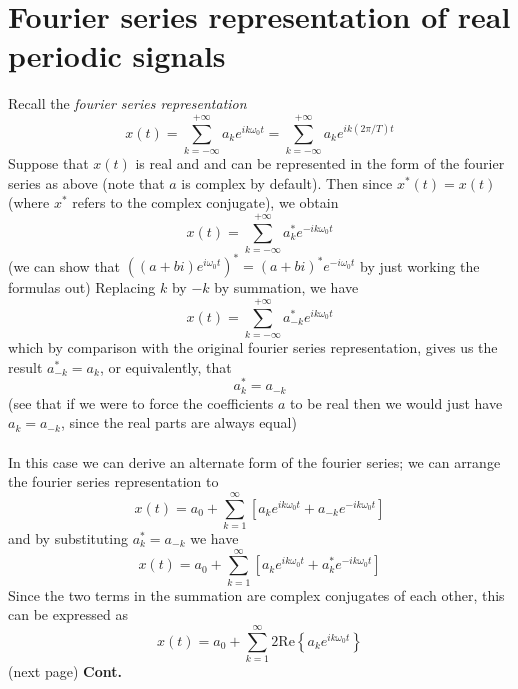 \documentclass{report}
\begin{document}
\section{Fourier series representation of real periodic signals}
Recall the \textit{fourier series representation}
\begin{equation*}
x(t)=\sum^{+\infty}_{k=-\infty}a_ke^{ik\omega_0t}=\sum^{+\infty}_{k=-\infty}a_ke^{ik(2\pi/T)t}
\end{equation*}
Suppose that $x(t)$ is real and and can be represented in the form of the fourier series as above
(note that $a$ is complex by default). Then since $x^*(t)=x(t)$ (where $x^*$ refers to the complex conjugate), we obtain 
\begin{equation*}
x(t)=\sum^{+\infty}_{k=-\infty}a^*_ke^{-ik\omega_0t}
\end{equation*}
(we can show that $\left((a+bi)e^{i\omega_0t}\right)^*=(a+bi)^*e^{-i\omega_0t}$ by just working the formulas out)
Replacing $k$ by $-k$ by summation, we have
\begin{equation*}
x(t)=\sum^{+\infty}_{k=-\infty}a^*_{-k}e^{ik\omega_0t}
\end{equation*}
which by comparison with the original fourier series representation, gives us the result $a^*_{-k}=a_k$, or equivalently, that
\begin{equation*}
a^*_{k}=a_{-k}
\end{equation*}
(see that if we were to force the coefficients $a$ to be real then we would just have $a_k=a_{-k}$, since the real parts are always equal)\\
\vspace{1mm}\\
In this case we can derive an alternate form of the fourier series; we can arrange the fourier series representation to
\begin{equation*}
x(t)=a_0+\sum^{\infty}_{k=1}[a_ke^{ik\omega_0t}+a_{-k}e^{-ik\omega_0t}]
\end{equation*}
and by substituting $a^*_{k}=a_{-k}$ we have
\begin{equation*}
x(t)=a_0+\sum^{\infty}_{k=1}[a_ke^{ik\omega_0t}+a^*_{k}e^{-ik\omega_0t}]
\end{equation*}
Since the two terms in the summation are complex conjugates of each other, this can be expressed as
\begin{equation*}
x(t)=a_0+\sum^\infty_{k=1}2\text{Re}\left\{a_ke^{ik\omega_0t}\right\}
\end{equation*}
(next page)\newpage
\noindent\textbf{Cont.}\\
\end{document}
